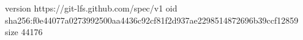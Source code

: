 version https://git-lfs.github.com/spec/v1
oid sha256:f0e44077a0273992500aa4436c92cf81f2d937ae2298514872696b39ccf12859
size 44176

